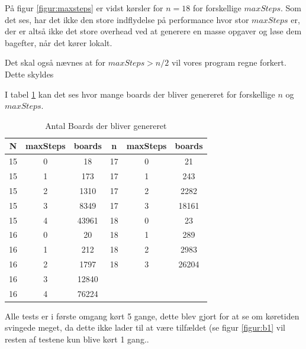 På figur \ref{figur:maxsteps} er vidst kørsler for $n=18$ for forskellige
$maxSteps$. 
Som det ses, har det ikke den store indflydelse på performance hvor stor
$maxSteps$ er, der er altså ikke det store overhead ved at generere en masse
opgaver og løse dem bagefter, når det kører lokalt. 

Det skal også nævnes at for $maxSteps>n/2$ vil vores program regne forkert.
Dette skyldes 


I tabel \ref{tabel:noboards} kan det ses hvor mange boards der bliver genereret
for forskellige $n$ og $maxSteps$. 

\begin{table}
	\begin{center}
		\begin{tabular}{|c|c|c|c|c|c|}
			\hline N  & maxSteps  & boards & n  & maxSteps & boards \\
			\hline 15 & 0         & 18     & 17 & 0        & 21     \\
			\hline 15 & 1         & 173    & 17 & 1        & 243    \\
			\hline 15 & 2         & 1310   & 17 & 2        & 2282   \\ 
			\hline 15 & 3         & 8349   & 17 & 3        & 18161  \\
			\hline 15 & 4         & 43961  & 18 & 0        & 23     \\
			\hline 16 & 0         & 20     & 18 & 1        & 289    \\
			\hline 16 & 1         & 212    & 18 & 2        & 2983   \\
			\hline 16 & 2         & 1797   & 18 & 3        & 26204  \\
			\hline 16 & 3         & 12840  &    &          &        \\
			\hline 16 & 4         & 76224  &    &          &        \\
			\hline
		\end{tabular}
		\caption{Antal Boards der bliver genereret}
		\label{tabel:noboards}
	\end{center}
\end{table}

Alle tests er i første omgang kørt 5 gange, dette blev gjort for at se om
køretiden svingede meget, da dette ikke lader til at være tilfældet (se figur
\ref{figur:b1} vil resten af testene kun blive kørt 1 gang.. 

